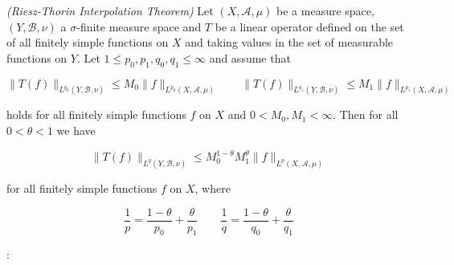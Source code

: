 \begin{mdframed}
	\begin{theorem}\emph{(Riesz-Thorin Interpolation Theorem)}
		Let $(X,\mathcal{A},\mu)$ be a measure space, $(Y,\mathcal{B},\nu)$ a $\sigma$-finite measure space and $T$ be a linear operator defined on the set of all finitely simple functions on $X$ and taking values in the set of measurable functions on $Y$. Let $1 \leqslant p_0,p_1,q_0,q_1 \leqslant \infty$ and assume that

		\begin{equation}
			\|T(f)\|_{L^{q_0}(Y,\mathcal{B},\nu)} \leqslant M_0\|f\|_{L^{p_0}(X,\mathcal{A},\mu)} \qquad \|T(f)\|_{L^{q_1}(Y,\mathcal{B},\nu)} \leqslant M_1\|f\|_{L^{p_1}(X,\mathcal{A},\mu)}
		\end{equation}

		holds for all finitely simple functions $f$ on $X$ and $0 < M_0,M_1 < \infty$. Then for all $0 < \theta < 1$ we have

		\begin{equation}
			\|T(f)\|_{L^q(Y,\mathcal{B},\nu)} \leqslant M_0^{1 - \theta}M_1^\theta\|f\|_{L^p(X,\mathcal{A},\mu)}
		\end{equation}

		for all finitely simple functions $f$ on $X$, where

		\begin{equation}
			\frac{1}{p} = \frac{1 - \theta}{p_0} + \frac{\theta}{p_1} \qquad \frac{1}{q} = \frac{1 - \theta}{q_0} + \frac{\theta}{q_1}
		\end{equation}
	\end{theorem}
\end{mdframed}
:
